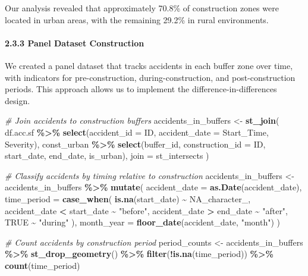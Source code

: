 \documentclass[
]{article}
\newenvironment{Shaded}{\begin{snugshade}}{\end{snugshade}}
\newcommand{\AttributeTok}[1]{\textcolor[rgb]{0.13,0.29,0.53}{#1}}
\newcommand{\CommentTok}[1]{\textcolor[rgb]{0.56,0.35,0.01}{\textit{#1}}}
\newcommand{\ConstantTok}[1]{\textcolor[rgb]{0.56,0.35,0.01}{#1}}
\newcommand{\FunctionTok}[1]{\textcolor[rgb]{0.13,0.29,0.53}{\textbf{#1}}}
\newcommand{\NormalTok}[1]{#1}
\newcommand{\OtherTok}[1]{\textcolor[rgb]{0.56,0.35,0.01}{#1}}
\newcommand{\SpecialCharTok}[1]{\textcolor[rgb]{0.81,0.36,0.00}{\textbf{#1}}}
\newcommand{\StringTok}[1]{\textcolor[rgb]{0.31,0.60,0.02}{#1}}
\begin{document}
Our analysis revealed that approximately 70.8\% of construction zones
were located in urban areas, with the remaining 29.2\% in rural
environments.

\paragraph{2.3.3 Panel Dataset
Construction}\label{panel-dataset-construction}

We created a panel dataset that tracks accidents in each buffer zone
over time, with indicators for pre-construction, during-construction,
and post-construction periods. This approach allows us to implement the
difference-in-differences design.

\begin{Shaded}
\begin{Highlighting}[]
\CommentTok{\# Join accidents to construction buffers}
\NormalTok{accidents\_in\_buffers }\OtherTok{\textless{}{-}} \FunctionTok{st\_join}\NormalTok{(}
\NormalTok{  df.acc.sf }\SpecialCharTok{\%\textgreater{}\%} 
    \FunctionTok{select}\NormalTok{(}\AttributeTok{accident\_id =}\NormalTok{ ID, }\AttributeTok{accident\_date =}\NormalTok{ Start\_Time, Severity),}
\NormalTok{  const\_urban }\SpecialCharTok{\%\textgreater{}\%} 
    \FunctionTok{select}\NormalTok{(buffer\_id, }\AttributeTok{construction\_id =}\NormalTok{ ID, start\_date, end\_date, is\_urban),}
  \AttributeTok{join =}\NormalTok{ st\_intersects}
\NormalTok{)}

\CommentTok{\# Classify accidents by timing relative to construction}
\NormalTok{accidents\_in\_buffers }\OtherTok{\textless{}{-}}\NormalTok{ accidents\_in\_buffers }\SpecialCharTok{\%\textgreater{}\%}
  \FunctionTok{mutate}\NormalTok{(}
    \AttributeTok{accident\_date =} \FunctionTok{as.Date}\NormalTok{(accident\_date),}
    \AttributeTok{time\_period =} \FunctionTok{case\_when}\NormalTok{(}
      \FunctionTok{is.na}\NormalTok{(start\_date) }\SpecialCharTok{\textasciitilde{}} \ConstantTok{NA\_character\_}\NormalTok{,}
\NormalTok{      accident\_date }\SpecialCharTok{\textless{}}\NormalTok{ start\_date }\SpecialCharTok{\textasciitilde{}} \StringTok{"before"}\NormalTok{,}
\NormalTok{      accident\_date }\SpecialCharTok{\textgreater{}}\NormalTok{ end\_date }\SpecialCharTok{\textasciitilde{}} \StringTok{"after"}\NormalTok{,}
      \ConstantTok{TRUE} \SpecialCharTok{\textasciitilde{}} \StringTok{"during"}
\NormalTok{    ),}
    \AttributeTok{month\_year =} \FunctionTok{floor\_date}\NormalTok{(accident\_date, }\StringTok{"month"}\NormalTok{)}
\NormalTok{  )}

\CommentTok{\# Count accidents by construction period}
\NormalTok{period\_counts }\OtherTok{\textless{}{-}}\NormalTok{ accidents\_in\_buffers }\SpecialCharTok{\%\textgreater{}\%}
  \FunctionTok{st\_drop\_geometry}\NormalTok{() }\SpecialCharTok{\%\textgreater{}\%}
  \FunctionTok{filter}\NormalTok{(}\SpecialCharTok{!}\FunctionTok{is.na}\NormalTok{(time\_period)) }\SpecialCharTok{\%\textgreater{}\%}
  \FunctionTok{count}\NormalTok{(time\_period)}
\end{Highlighting}
\end{Shaded}
\end{document}
